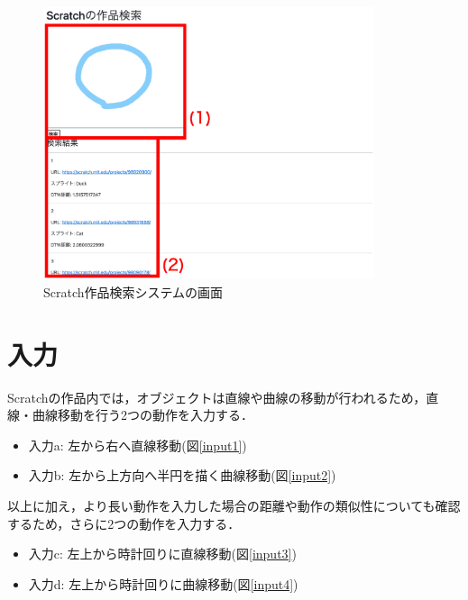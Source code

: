 \documentclass[11pt]{jreport}
\begin{document}
\begin{figure}[H]
    \centering
    \includegraphics[height=8cm]{systemdisplay.eps}
    \caption{Scratch作品検索システムの画面}
    \label{systemdisplay}
\end{figure}

\section{入力}
Scratchの作品内では，オブジェクトは直線や曲線の移動が行われるため，直線・曲線移動を行う2つの動作を入力する．

\begin{itemize}
    \item 入力a: 左から右へ直線移動(図\ref{input1})
    \item 入力b: 左から上方向へ半円を描く曲線移動(図\ref{input2})
\end{itemize}

以上に加え，より長い動作を入力した場合の距離や動作の類似性についても確認するため，さらに2つの動作を入力する．

\begin{itemize}
    \item 入力c: 左上から時計回りに直線移動(図\ref{input3})
    \item 入力d: 左上から時計回りに曲線移動(図\ref{input4})
\end{itemize}
\end{document}
